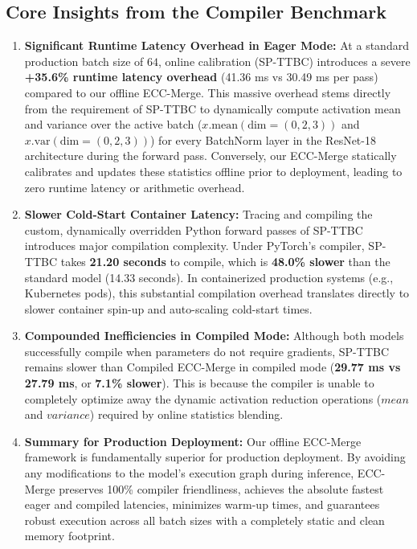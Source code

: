 \documentclass{article}
\theoremstyle{plain}
\theoremstyle{definition}
\theoremstyle{remark}
\begin{document}
\subsection{Core Insights from the Compiler Benchmark}
\begin{enumerate}
    \item \textbf{Significant Runtime Latency Overhead in Eager Mode:} At a standard production batch size of $64$, online calibration (SP-TTBC) introduces a severe \textbf{+35.6\% runtime latency overhead} (41.36 ms vs 30.49 ms per pass) compared to our offline ECC-Merge. This massive overhead stems directly from the requirement of SP-TTBC to dynamically compute activation mean and variance over the active batch ($x.\text{mean}(\text{dim}=(0,2,3))$ and $x.\text{var}(\text{dim}=(0,2,3))$) for every BatchNorm layer in the ResNet-18 architecture during the forward pass. Conversely, our ECC-Merge statically calibrates and updates these statistics offline prior to deployment, leading to zero runtime latency or arithmetic overhead.
    \item \textbf{Slower Cold-Start Container Latency:} Tracing and compiling the custom, dynamically overridden Python forward passes of SP-TTBC introduces major compilation complexity. Under PyTorch's compiler, SP-TTBC takes \textbf{21.20 seconds} to compile, which is \textbf{48.0\% slower} than the standard model (14.33 seconds). In containerized production systems (e.g., Kubernetes pods), this substantial compilation overhead translates directly to slower container spin-up and auto-scaling cold-start times.
    \item \textbf{Compounded Inefficiencies in Compiled Mode:} Although both models successfully compile when parameters do not require gradients, SP-TTBC remains slower than Compiled ECC-Merge in compiled mode (\textbf{29.77 ms vs 27.79 ms}, or \textbf{7.1\% slower}). This is because the compiler is unable to completely optimize away the dynamic activation reduction operations ($mean$ and $variance$) required by online statistics blending. 
    \item \textbf{Summary for Production Deployment:} Our offline ECC-Merge framework is fundamentally superior for production deployment. By avoiding any modifications to the model's execution graph during inference, ECC-Merge preserves 100\% compiler friendliness, achieves the absolute fastest eager and compiled latencies, minimizes warm-up times, and guarantees robust execution across all batch sizes with a completely static and clean memory footprint.
\end{enumerate}
\end{document}
